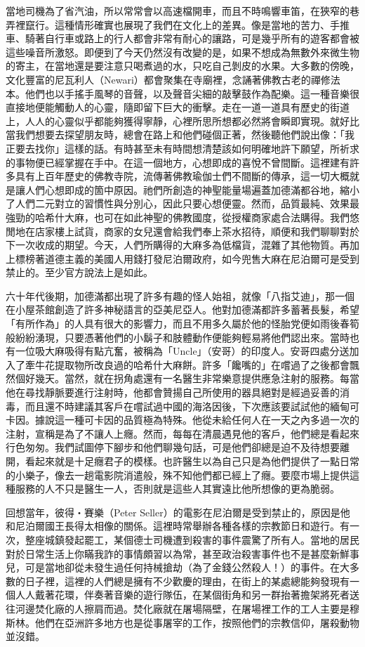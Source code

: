 當地司機為了省汽油，所以常常會以高速檔開車，而且不時鳴響車笛，在狹窄的巷弄裡竄行。這種情形確實也展現了我們在文化上的差異。像是當地的苦力、手推車、騎著自行車或路上的行人都會非常有耐心的讓路，可是幾乎所有的遊客都會被這些噪音所激怒。即便到了今天仍然沒有改變的是，如果不想成為無數外來微生物的寄主，在當地還是要注意只喝煮過的水，只吃自己剝皮的水果。大多數的傍晚，文化豐富的尼瓦利人（Newari）都會聚集在寺廟裡，念誦著佛教古老的禪修法本。他們也以手搖手風琴的音聲，以及聲音尖細的敲擊鼓作為配樂。這一種音樂很直接地便能觸動人的心靈，隨即留下巨大的衝擊。走在一道一道具有歷史的街道上，人人的心靈似乎都能夠獲得寧靜，心裡所思所想都必然將會瞬即實現。就好比當我們想要去探望朋友時，總會在路上和他們碰個正著，然後聽他們說出像：「我正要去找你」這樣的話。有時甚至未有時間想清楚該如何明確地許下願望，所祈求的事物便已經掌握在手中。在這一個地方，心想即成的喜悅不曾間斷。這裡建有許多具有上百年歷史的佛教寺院，流傳著佛教瑜伽士們不間斷的傳承，這一切大概就是讓人們心想即成的箇中原因。祂們所創造的神聖能量場遍蓋加德滿都谷地，縮小了人們二元對立的習慣性與分別心，因此只要心想便靈。然而，品質最純、效果最強勁的哈希什大麻，也可在如此神聖的佛教國度，從授權商家處合法購得。我們悠閒地在店家樓上試貨，商家的女兒還會給我們奉上茶水招待，順便和我們聊聊對於下一次收成的期望。今天，人們所購得的大麻多為低檔貨，混雜了其他物質。再加上標榜著道德主義的美國人用錢打發尼泊爾政府，如今兜售大麻在尼泊爾可是受到禁止的。至少官方說法上是如此。

六十年代後期，加德滿都出現了許多有趣的怪人始祖，就像「八指艾迪」，那一個在小屋茶館創造了許多神秘語言的亞美尼亞人。他對加德滿都許多蓄著長髮，希望「有所作為」的人具有很大的影響力，而且不用多久屬於他的怪胎党便如雨後春筍般紛紛湧現，只要憑著他們的小鬍子和肢體動作便能夠輕易將他們認出來。當時也有一位吸大麻吸得有點亢奮，被稱為「Uncle」（安哥）的印度人。安哥四處分送加入了牽牛花提取物所改良過的哈希什大麻餅。許多「饞嘴的」在嚐過了之後都會飄然個好幾天。當然，就在拐角處還有一名醫生非常樂意提供應急注射的服務。每當他在尋找靜脈要進行注射時，他都會贊揚自己所使用的器具絕對是經過妥善的消毒，而且還不時建議其客戶在嚐試過中國的海洛因後，下次應該要試試他的緬甸可卡因。據說這一種可卡因的品質極為特殊。他從未給任何人在一天之內多過一次的注射，宣稱是為了不讓人上癮。然而，每每在清晨遇見他的客戶，他們總是看起來行色匆匆。我們試圖停下腳步和他們聊幾句話，可是他們卻總是迫不及待想要離開，看起來就是十足癮君子的模樣。也許醫生以為自己只是為他們提供了一點日常的小樂子，像去一趟電影院消遣般，殊不知他們都已經上了癮。要麼市場上提供這種服務的人不只是醫生一人，否則就是這些人其實遠比他所想像的更為脆弱。

回想當年，彼得‧賽樂（Peter
Seller）的電影在尼泊爾是受到禁止的，原因是他和尼泊爾國王長得太相像的關係。這裡時常舉辦各種各樣的宗教節日和遊行。有一次，整座城鎮發起罷工，某個德士司機遭到殺害的事件震驚了所有人。當地的居民對於日常生活上你瞞我詐的事情頗習以為常，甚至政治殺害事件也不是甚麼新鮮事兒，可是當地卻從未發生過任何持械搶劫（為了金錢公然殺人！）的事件。在大多數的日子裡，這裡的人們總是擁有不少歡慶的理由，在街上的某處總能夠發現有一個人人戴著花環，伴奏著音樂的遊行隊伍，在某個街角和另一群抬著擔架將死者送往河邊焚化廠的人擦肩而過。焚化廠就在屠場隔壁，在屠場裡工作的工人主要是穆斯林。他們在亞洲許多地方也是從事屠宰的工作，按照他們的宗教信仰，屠殺動物並沒錯。

